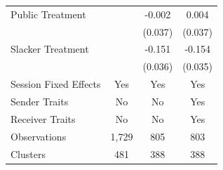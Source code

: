 \begin{tabular}{lccc}
Public Treatment&                  &   -0.002         &    0.004         \\
                &                  &  (0.037)         &  (0.037)         \\
Slacker Treatment&                  &   -0.151\sym{***}&   -0.154\sym{***}\\
                &                  &  (0.036)         &  (0.035)         \\
Session Fixed Effects &      Yes         &      Yes         &      Yes         \\
Sender Traits   &       No         &       No         &      Yes         \\
Receiver Traits &       No         &       No         &      Yes         \\
\midrule
Observations    &    1,729         &      805         &      803         \\
Clusters        &      481         &      388         &      388         \\
\bottomrule
\end{tabular}
